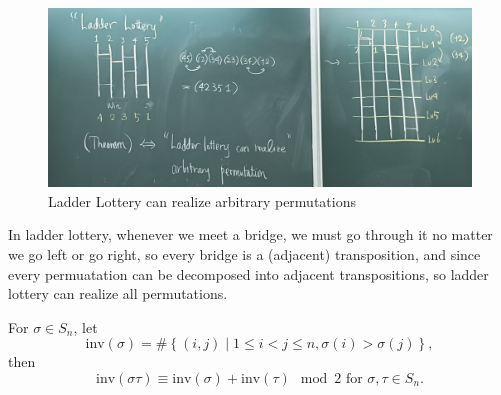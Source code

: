 \begin{figure}[H]
    \centering
    \includegraphics[width=\textwidth]{./Figures/LadderLottery.jpg}
    \caption{Ladder Lottery can realize arbitrary permutations}
    \label{fig:Ladder Lottery}
\end{figure}
\begin{remark}
    In ladder lottery, whenever we meet a bridge, we must go through it no matter we go left or go right, so every bridge is a (adjacent) transposition, and since every permuatation can be decomposed into adjacent transpositions, so ladder lottery can realize all permutations.
\end{remark}
\begin{theorem}
    For \(\sigma \in S_n\), let 
    \[
        \mathrm{inv}(\sigma ) = \# \left\{ (i, j) \mid 1 \le i < j \le n, \sigma (i) > \sigma (j) \right\},  
    \] then 
    \[
        \mathrm{inv}(\sigma \tau ) \equiv \mathrm{inv}(\sigma ) + \mathrm{inv}(\tau ) \mod{2} \text{ for } \sigma , \tau \in S_n.   
    \]
\end{theorem}
